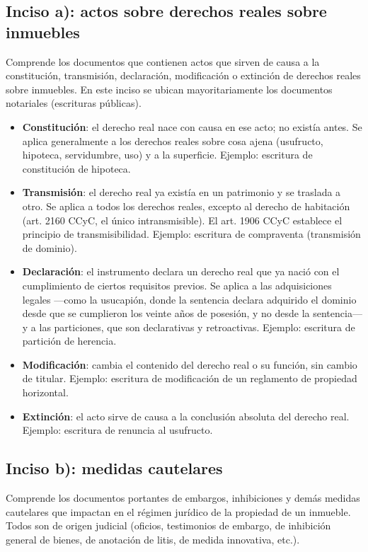 \documentclass[12pt,oneside]{book}
\begin{document}
\subsection{Inciso a): actos sobre derechos reales sobre inmuebles}

Comprende los documentos que contienen actos que sirven de causa a la constitución, transmisión, declaración, modificación o extinción de derechos reales sobre inmuebles. En este inciso se ubican mayoritariamente los documentos notariales (escrituras públicas).

\begin{itemize}
\item \textbf{Constitución}: el derecho real nace con causa en ese acto; no existía antes. Se aplica generalmente a los derechos reales sobre cosa ajena (usufructo, hipoteca, servidumbre, uso) y a la superficie. Ejemplo: escritura de constitución de hipoteca.
\item \textbf{Transmisión}: el derecho real ya existía en un patrimonio y se traslada a otro. Se aplica a todos los derechos reales, excepto al derecho de habitación (art. 2160 CCyC, el único intransmisible). El art. 1906 CCyC establece el principio de transmisibilidad. Ejemplo: escritura de compraventa (transmisión de dominio).
\item \textbf{Declaración}: el instrumento declara un derecho real que ya nació con el cumplimiento de ciertos requisitos previos. Se aplica a las adquisiciones legales —como la usucapión, donde la sentencia declara adquirido el dominio desde que se cumplieron los veinte años de posesión, y no desde la sentencia— y a las particiones, que son declarativas y retroactivas. Ejemplo: escritura de partición de herencia.
\item \textbf{Modificación}: cambia el contenido del derecho real o su función, sin cambio de titular. Ejemplo: escritura de modificación de un reglamento de propiedad horizontal.
\item \textbf{Extinción}: el acto sirve de causa a la conclusión absoluta del derecho real. Ejemplo: escritura de renuncia al usufructo.
\end{itemize}

\subsection{Inciso b): medidas cautelares}

Comprende los documentos portantes de embargos, inhibiciones y demás medidas cautelares que impactan en el régimen jurídico de la propiedad de un inmueble. Todos son de origen judicial (oficios, testimonios de embargo, de inhibición general de bienes, de anotación de litis, de medida innovativa, etc.).
\end{document}
